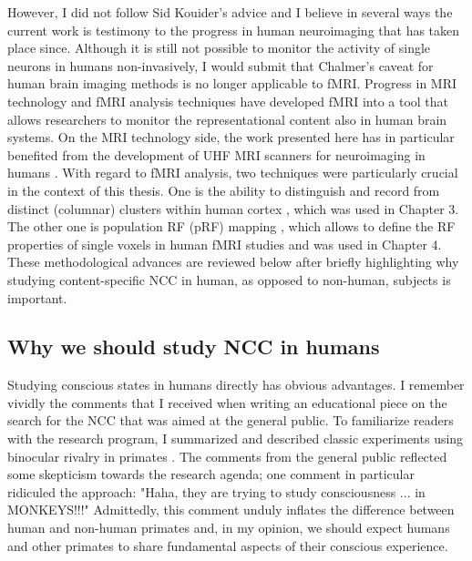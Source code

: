 However, I did not follow Sid Kouider's advice and I believe in several ways the current work is testimony to the progress in human neuroimaging that has taken place since. Although it is still not possible to monitor the activity of single neurons in humans non-invasively, I would submit that Chalmer's caveat for human brain imaging methods is no longer applicable to fMRI. Progress in MRI technology \parencite{Vaughan2001, Duyn2011, Ugurbil2014} and fMRI analysis techniques \parencite{Wandell2015, DeMartino2016, Kashyap2017, Kemper2017, Polimeni2017} have developed fMRI into a tool that allows researchers to monitor the representational content also in human brain systems. On the MRI technology side, the work presented here has in particular benefited from the development of UHF MRI scanners for neuroimaging in humans \parencite{Ugurbil2003}. With regard to fMRI analysis, two techniques were particularly crucial in the context of this thesis. One is the ability to distinguish and record from distinct (columnar) clusters within human cortex \parencite{Cheng2001, Yacoub2007, Yacoub2008}, which was used in Chapter 3. The other one is population RF (pRF) mapping \parencite{Dumoulin2008}, which allows to define the RF properties of single voxels in human fMRI studies and was used in Chapter 4. These methodological advances are reviewed below after briefly highlighting why studying content-specific NCC in human, as opposed to non-human, subjects is important.

\subsection{Why we should study NCC in humans}
Studying conscious states in humans directly has obvious advantages. I remember vividly the comments that I received when writing an educational piece on the search for the NCC that was aimed at the general public. To familiarize readers with the research program, I summarized and described classic experiments using binocular rivalry in primates \parencite{Logothetis1989, Sheinberg1997}. The comments from the general public reflected some skepticism towards the research agenda; one comment in particular ridiculed the approach: "Haha, they are trying to study consciousness ... in MONKEYS!!!" Admittedly, this comment unduly inflates the difference between human and non-human primates and, in my opinion, we should expect humans and other primates to share fundamental aspects of their conscious experience.

